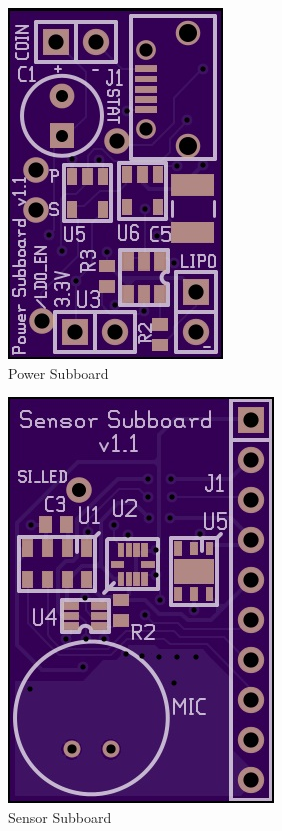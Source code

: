 \documentclass[a4paper]{article}
\begin{document}
\begin{figure}
\centering
\includegraphics{power_subboard.jpg}
\caption{\label{fig:powerSubboard}Power Subboard}
\end{figure}

\begin{figure}
\centering
\includegraphics{sensor_subboard.jpg}
\caption{\label{fig:sensorSubboard}Sensor Subboard}
\end{figure}
\end{document}
